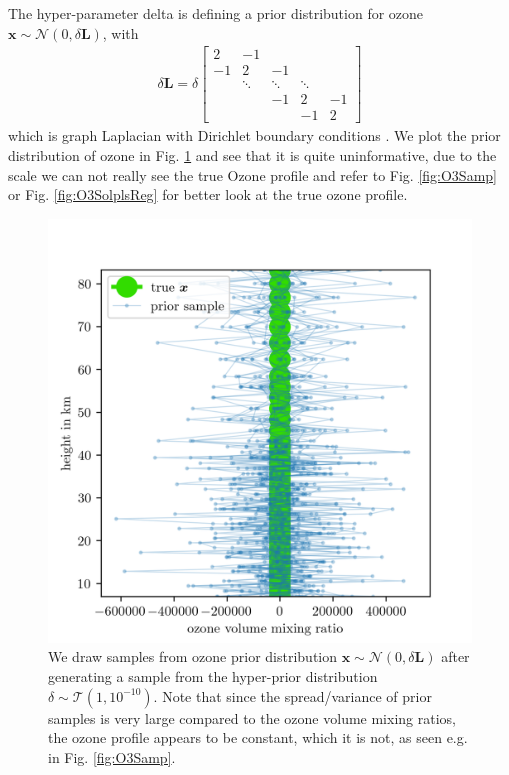 The hyper-parameter delta is defining a prior distribution for ozone $\bm{x} \sim \mathcal{N}(0,\delta \bm{L})$, with 
\begin{align}
	\delta \bm{L} =
	\delta
	\begin{bmatrix}
		2 & -1 & & &  \\
		-1 & 2 & -1 & &   \\
		& \ddots & \ddots & \ddots &\\ 
		& & -1 & 2 & -1  \\
		& & & -1 & 2 
	\end{bmatrix} 
\label{eq:GLapl} 
\end{align}
which is graph Laplacian with Dirichlet boundary conditions \cite{wang2015trend}.
We plot the prior distribution of ozone in Fig. \ref{fig:O3Prior} and see that it is quite uninformative, due to the scale we can  not really see the true Ozone profile and refer to Fig. \ref{fig:O3Samp} or Fig. \ref{fig:O3SolplsReg} for better look at the true ozone profile.
\begin{figure}[ht!]
	\centering
	\includegraphics{OzonePrior.png}
	\caption[Samples from ozone prior distribution.]{We draw samples from ozone prior distribution $\bm{x} \sim \mathcal{N}(0,\delta \bm{L})$ after generating a sample from the hyper-prior distribution $\delta \sim \mathcal{T}(1,10^{-10})$. Note that since the spread/variance of prior samples is very large compared to the ozone volume mixing ratios, the ozone profile appears to be constant, which it is not, as seen e.g. in Fig. \ref{fig:O3Samp}.}
	\label{fig:O3Prior}
\end{figure}

